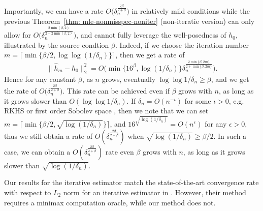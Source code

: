 Importantly, we can have a rate $O\big(\delta_n^{\frac{2\beta}{2 + \beta}}\big)$ in relatively mild conditions while the previous Theorem~\ref{thm: mle-nonmisspec-noniter} (non-iteratie version) can only allow for $O\big(\delta_n^{\frac{2\min(\beta,2)}{2 + 2\min(\beta,2)}}\big)$, and cannot fully leverage the well-posedness of $h_0$, illustrated by the source condtion $\beta$. Indeed, if we choose the iteration number $m = \lceil \min\{\beta/ 2, \log\log(1/\delta_n)\} \rceil$, then we get a rate of $$\|\hat{h}_m - h_0\|_2^2 = O\bigg(\min\{16^\beta, \log (1/\delta_n)\}\delta_n^{\frac{2\min\{\beta, 2m\}}{2 + \min\{\beta, 2m\}}}\bigg) .$$ Hence for any constant $\beta$, as $n$ grows, eventually $\log\log 1/\delta_n \geq \beta $, and we get the rate of $O\big(\delta_n^{\frac{2\beta}{2 + \beta}}\big)$. This rate can be achieved even if $\beta$ grows with $n$, as long as it grows slower than $O(\log\log 1/\delta_n)$. If $\delta_n = O(n^{-\iota})$ for some $\iota > 0 $, e.g. RKHS or first order Sobolev space \citep[Chapt 14.1.2]{wainwright2019high}, then we note that we can set $m = \lceil \min\{\beta/ 2, \sqrt{\log(1/\delta_n)}\} \rceil$, and $16^{\sqrt{\log(1/\delta_n)}} = O(n^{\epsilon})$ for any $\epsilon > 0$, thus we still obtain a rate of $O(\delta_n^{\frac{2\beta}{2+\beta}})$ when $\sqrt{\log(1/\delta_n)} \geq \beta/2$. In such a case, we can obtain a $O(\delta_n^{\frac{2\beta}{2+\beta}})$ rate even $\beta$ grows with $n$, as long as it grows slower than $\sqrt{\log(1/\delta_n)}$.

Our results for the iterative estimator match the state-of-the-art convergence rate with respect to $L_2$ norm for an iterative estimator in \cite{bennett2023source}. However, their method requires a minimax computation oracle, while our method does not.






